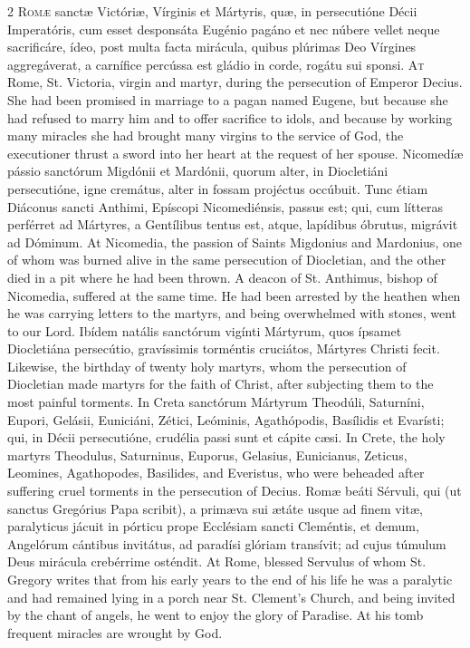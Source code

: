 \begin{paracol}{2}
\lettrine[lines=2]{R}{omæ} sanctæ Victóriæ, Vírginis et Mártyris, quæ, 
 in persecutióne Décii Imperatóris, cum esset desponsáta Eugénio pagáno et 
 nec núbere vellet neque sacrificáre, ídeo, post multa facta mirácula, quibus 
 plúrimas Deo Vírgines aggregáverat, a carnífice percússa est gládio in corde, 
 rogátu sui sponsi.
\switchcolumn
{}
\lettrine[lines=2]{A}{t} Rome, St. Victoria, virgin and martyr, during the persecution of Emperor 
 Decius. She had been promised in marriage to a pagan named Eugene, but 
 because she had refused to marry him and to offer sacrifice to idols, and 
 because by working many miracles she had brought many virgins to the service 
 of God, the executioner thrust a sword into her heart at the request of her 
 spouse.
\switchcolumn*
{}
Nicomedíæ pássio sanctórum Migdónii et Mardónii, 
 quorum alter, in Diocletiáni persecutióne, igne cremátus, alter in fossam 
 projéctus occúbuit. Tunc étiam Diáconus sancti Anthimi, Epíscopi 
 Nicomediénsis, passus est; qui, cum lítteras perférret ad Mártyres, a 
 Gentílibus tentus est, atque, lapídibus óbrutus, migrávit ad Dóminum.
\switchcolumn
{}
At Nicomedia, the passion of Saints Migdonius and Mardonius, one of whom was 
 burned alive in the same persecution of Diocletian, and the other died in a 
 pit where he had been thrown. A deacon of St. Anthimus, bishop of 
 Nicomedia, suffered at the same time. He had been arrested by the 
 heathen when he was carrying letters to the martyrs, and being overwhelmed 
 with stones, went to our Lord.
\switchcolumn*
{}
Ibídem natális sanctórum vigínti Mártyrum, quos 
 ípsamet Diocletiána persecútio, gravíssimis torméntis cruciátos, 
 Mártyres Christi fecit.
\switchcolumn
{}
Likewise, the birthday of twenty holy martyrs, whom the persecution of 
 Diocletian made martyrs for the faith of Christ, after subjecting them to 
 the most painful torments.
\switchcolumn*
{}
In Creta sanctórum Mártyrum Theodúli, Saturníni, 
 Eupori, Gelásii, Euniciáni, Zétici, Leóminis, Agathópodis, Basílidis et 
 Evarísti; qui, in Décii persecutióne, crudélia passi sunt et cápite cæsi.
\switchcolumn
{}
In Crete, the holy martyrs Theodulus, Saturninus, Euporus, Gelasius, 
 Eunicianus, Zeticus, Leomines, Agathopodes, Basilides, and Everistus, who 
 were beheaded after suffering cruel torments in the persecution of Decius.
\switchcolumn*
{}
Romæ beáti Sérvuli, qui (ut sanctus Gregórius 
 Papa scribit), a primæva sui ætáte usque ad finem vitæ, paralyticus jácuit 
 in pórticu prope Ecclésiam sancti Cleméntis, et demum, Angelórum cántibus 
 invitátus, ad paradísi glóriam transívit; ad cujus túmulum Deus mirácula 
 crebérrime osténdit.
\switchcolumn
{}
At Rome, blessed Servulus of whom St. Gregory writes that from his early 
 years to the end of his life he was a paralytic and had remained lying in a 
 porch near St. Clement's Church, and being invited by the chant of angels, 
 he went to enjoy the glory of Paradise. At his tomb frequent miracles 
 are wrought by God.
\switchcolumn*
{}
\end{paracol}


